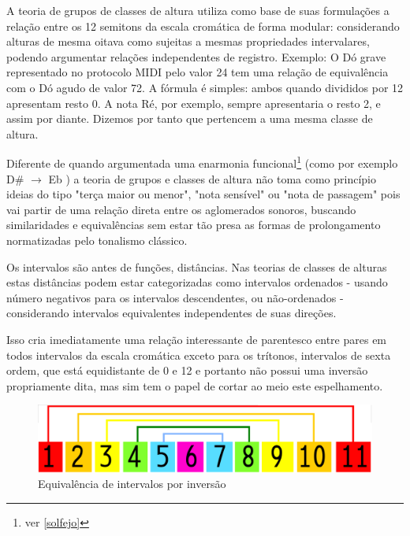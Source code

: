 \documentclass[
	12pt,				%
	openright,			%
	twoside,			%
	a4paper,			%
	english,			%
	french,				%
	spanish,			%
	brazil				%
	]{abntex2}
\begin{document}
A teoria de grupos de classes de altura utiliza como base de suas formulações a relação entre os 12 semitons da escala cromática de forma modular: considerando alturas de mesma oitava como sujeitas a mesmas propriedades intervalares, podendo argumentar relações independentes de registro. Exemplo: O Dó grave representado no protocolo MIDI pelo valor 24 tem uma relação de equivalência com o Dó agudo de valor 72. A fórmula é simples: ambos quando divididos por 12 apresentam resto 0. A nota Ré, por exemplo, sempre apresentaria o resto 2, e assim por diante. Dizemos por tanto que pertencem a uma mesma classe de altura.

Diferente de quando argumentada uma enarmonia funcional\footnote{ver \autoref{solfejo} } (como por exemplo D\# $\to$ Eb ) a teoria de grupos e classes de altura não toma como princípio ideias do tipo "terça maior ou menor", "nota sensível" ou "nota de passagem" pois vai partir de uma relação direta entre os aglomerados sonoros, buscando similaridades e equivalências sem estar tão presa as formas de prolongamento normatizadas pelo tonalismo clássico.\cite{lerdahl1989atonal,straus1987problem}

Os intervalos são antes de funções, distâncias. Nas teorias de classes de alturas estas distâncias podem estar categorizadas como intervalos ordenados - usando número negativos para os intervalos descendentes, ou não-ordenados - considerando intervalos equivalentes independentes de suas direções.\cite[pg. 6]{straus2004}

Isso cria imediatamente uma relação interessante de parentesco entre pares em todos intervalos da escala cromática exceto para os trítonos, intervalos de sexta ordem, que está equidistante de 0 e 12 e portanto não possui uma inversão propriamente dita, mas sim tem o papel de cortar ao meio este espelhamento.

\begin{figure}[!h]
	\caption{\label{fig_grafico}Equivalência de intervalos por inversão }
	\begin{center}
	    \includegraphics[scale=0.3]{algo/equivalencia_inversa.png}
	\end{center}
\end{figure}
\end{document}
